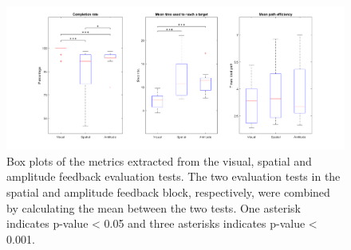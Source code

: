 \begin{figure}[h]                 
	\includegraphics[width=1.06\textwidth]{figures/boxplot_results}
	\caption{Box plots of the metrics extracted from the visual, spatial and amplitude feedback evaluation tests. The two evaluation tests in the spatial and amplitude feedback block, respectively, were combined by calculating the mean between the two tests. One asterisk indicates p-value < 0.05 and three asterisks indicates p-value < 0.001.}
	\label{fig:pa:boxplot_results} 
\end{figure}

